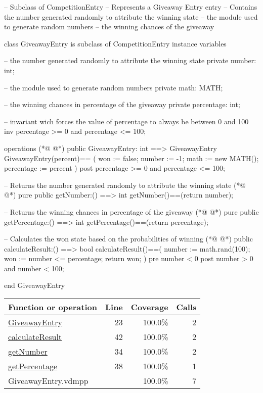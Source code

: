 \begin{vdmpp}[breaklines=true]
-- Subclass of CompetitionEntry
-- Represents a Giveaway Entry entry
-- Contains the number generated randomly to attribute the winning state
--      the module used to generate random numbers
--      the winning chances of the giveaway

class GiveawayEntry is subclass of CompetitionEntry
 instance variables
 
  -- the number generated randomly to attribute the winning state
    private number: int;
    
    -- the module used to generate random numbers
    private math: MATH;
    
    -- the winning chances in percentage of the giveaway
  private percentage: int;
  
  -- invariant wich forces the value of percentage to always be between 0 and 100
  inv percentage >= 0 and percentage <= 100;
  
operations
(*@
\label{GiveawayEntry:23}
@*)
  public GiveawayEntry: int  ==> GiveawayEntry
  GiveawayEntry(percent)== 
  (
    won := false;
    number := -1;
     math := new MATH();
     percentage := percent
  )
  post percentage >= 0 and percentage <= 100;
  
  -- Returns the number generated randomly to attribute the winning state
(*@
\label{getNumber:34}
@*)
  pure public getNumber:() ==> int
     getNumber()==(return number);
     
   -- Returns the winning chances in percentage of the giveaway
(*@
\label{getPercentage:38}
@*)
   pure public getPercentage:() ==> int
     getPercentage()==(return percentage);
     
   -- Calculates the won state based on the probabilities of winning  
(*@
\label{calculateResult:42}
@*)
   public calculateResult:() ==> bool
    calculateResult()==(
     number := math.rand(100);
      won := number <= percentage;
     return won;
    ) 
    pre number < 0
    post number > 0 and number < 100;
   
end GiveawayEntry
\end{vdmpp}
\bigskip
\begin{longtable}{|l|r|r|r|}
\hline
Function or operation & Line & Coverage & Calls \\
\hline
\hline
\hyperref[GiveawayEntry:23]{GiveawayEntry} & 23&100.0\% & 2 \\
\hline
\hyperref[calculateResult:42]{calculateResult} & 42&100.0\% & 2 \\
\hline
\hyperref[getNumber:34]{getNumber} & 34&100.0\% & 2 \\
\hline
\hyperref[getPercentage:38]{getPercentage} & 38&100.0\% & 1 \\
\hline
\hline
GiveawayEntry.vdmpp & & 100.0\% & 7 \\
\hline
\end{longtable}

